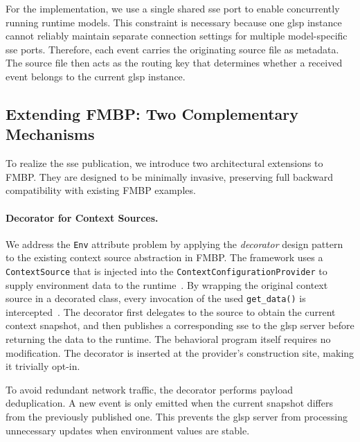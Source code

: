 For the implementation, we use a single shared \gls{sse} port to enable concurrently running runtime models.
This constraint is necessary because one \gls{glsp} instance cannot reliably maintain separate connection settings for multiple model-specific \gls{sse} ports.
Therefore, each event carries the originating source file as metadata.
The source file then acts as the routing key that determines whether a received event belongs to the current \gls{glsp} instance.

\subsection{Extending FMBP: Two Complementary Mechanisms}
\label{subsec:concept_fmbp_extensions}
 
To realize the \gls{sse} publication, we introduce two architectural extensions to FMBP.
They are designed to be minimally invasive, preserving full backward compatibility with existing FMBP examples.
 
\paragraph{Decorator for Context Sources.}
We address the \texttt{Env} attribute problem by applying the \textit{decorator} design pattern~\cite{gamma_design_1993} to the existing context source abstraction in FMBP.
The framework uses a \texttt{ContextSource} that is injected into the \texttt{ContextConfigurationProvider} to supply environment data to the runtime~\cite{felber_comprehensible_2025}.
By wrapping the original context source in a decorated class, every invocation of the used \texttt{get\_data()} is intercepted~\cite{felber_tfelbrfmbp_2025}.
The decorator first delegates to the source to obtain the current context snapshot, and then publishes a corresponding \gls{sse} to the \gls{glsp} server before returning the data to the runtime.
The behavioral program itself requires no modification.
The decorator is inserted at the provider's construction site, making it trivially opt-in.
 
To avoid redundant network traffic, the decorator performs payload deduplication.
A new event is only emitted when the current snapshot differs from the previously published one.
This prevents the \gls{glsp} server from processing unnecessary updates when environment values are stable.
 
